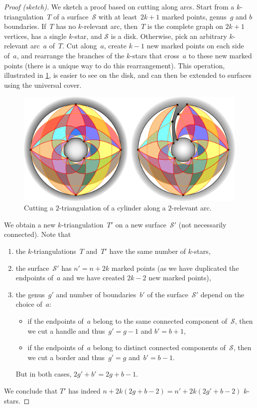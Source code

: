 \documentclass{amsart}
\theoremstyle{remark}
\newcommand{\surface}{\mathcal{S}}
\begin{document}
\begin{proof}[Proof (sketch)]
%
We sketch a proof based on cutting along arcs.
Start from a $k$-triangulation~$T$ of a surface~$\surface$ with at least~$2k+1$ marked points, genus~$g$ and $b$ boundaries.
If~$T$ has no $k$-relevant arc, then~$T$ is the complete graph on $2k+1$ vertices, has a single $k$-star, and $\surface$ is a disk.
Otherwise, pick an arbitrary $k$-relevant arc~$a$ of~$T$.
Cut along~$a$, create $k-1$ new marked points on each side of~$a$, and rearrange the branches of the $k$-stars that cross~$a$ to these new marked points (there is a unique way to do this rearrangement).
This operation, illustrated in \cref{fig:cutSurface}, is easier to see on the disk, and can then be extended to surfaces using the universal cover.
%
\begin{figure}[t]
	\capstart
	\centerline{\includegraphics[scale=.5]{2triangCylinderCut}}
	\caption{Cutting a $2$-triangulation of a cylinder along a $2$-relevant arc.}
	\label{fig:cutSurface}
\end{figure}
%
We obtain a new $k$-triangulation~$T'$ on a new surface~$\surface'$ (not necessarily connected).
Note that
\begin{enumerate}
\item the $k$-triangulations~$T$ and~$T'$ have the same number of $k$-stars,
\item the surface~$\surface'$ has $n' = n+2k$ marked points (as we have duplicated the endpoints of~$a$ and we have created $2k-2$ new marked points),
\item the genus~$g'$ and number of boundaries~$b'$ of the surface~$\surface'$ depend on the choice of~$a$:
	\begin{itemize}
	\item if the endpoints of~$a$ belong to the same connected component of~$\surface$, then we cut a handle and thus~$g' = g-1$ and $b' = b+1$,
	\item if the endpoints of~$a$ belong to distinct connected components of~$\surface$, then we cut a border and thus~$g' = g$ and~$b' = b-1$.
	\end{itemize}
	But in both cases, $2g'+b' = 2g+b-1$.
\end{enumerate}
We conclude that $T'$ has indeed $n + 2k(2g + b -2) = n' + 2k(2g' + b - 2)$ $k$-stars.


\end{proof}
\end{document}
